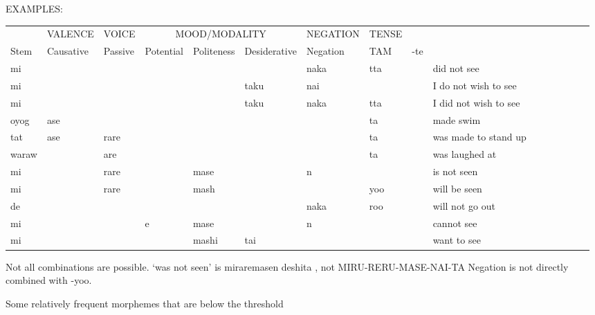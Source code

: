\documentclass[11pt,letterpaper]{article}
\begin{document}
EXAMPLES:

\begin{tabular}{lllllllll|lllllll}
     & VALENCE   & VOICE    & \multicolumn{3}{c}{MOOD/MODALITY} & NEGATION & TENSE \\
Stem & Causative & Passive & Potential & Politeness & Desiderative & Negation & TAM & -te & \\ \hline
mi &          &      & &            &          & naka     & tta &    & did not see \cite[153]{vaccari1938complete}\\
mi &          &      & &            & taku     & nai      &     &     & I do not wish to see \cite[98]{vaccari1938complete} \\
mi &          &      & &            & taku     & naka    & tta  &      & I did not wish to see \cite[98]{vaccari1938complete} \\
oyog & ase    &      & &            &          &         & ta    &     & made swim \\
tat & ase     & rare & &            &          &         & ta    &     & was made to stand up \cite[396]{kaiser2013japanese} \\
waraw  &       & are & &            &           &         & ta    &    & was laughed at \cite[384]{kaiser2013japanese} \\
mi     &       & rare& & mase       &          & n        &      &     & is not seen \cite[337]{vaccari1938complete} \\
mi     &       & rare& & mash      &           &          & yoo  &    & will be seen \cite[337]{vaccari1938complete} \\
de     &       &    & &            &           & naka     & roo  &    & will not go out \cite[170]{vaccari1938complete} \\
mi     &       &    & e & mase       &           & n        &      &    & cannot see \cite[349]{vaccari1938complete} \\
mi     &       &    & & mashi      & tai       &          &      &    & want to see
\end{tabular}


Not all combinations are possible. 
`was not seen' is miraremasen deshita \cite[337]{vaccari1938complete}, not MIRU-RERU-MASE-NAI-TA
Negation is not directly combined with -yoo.

Some relatively frequent morphemes that are below the threshold
\end{document}
